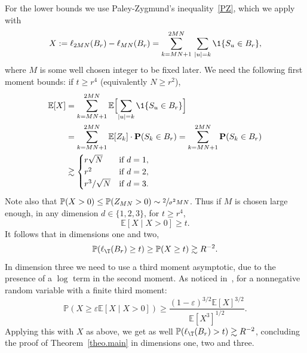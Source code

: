For the lower bounds we use Paley-Zygmund's inequality~\eqref{PZ},
which we apply with
\[
X:= \ell_{2MN}(B_r) - \ell_{MN}(B_r) = \sum_{k=MN+1}^{2MN}\,
\sum_{|u|=k} \1\{S_u\in B_r\},
\]
where $M$ is some well chosen integer to be fixed later.
We need the following first moment bounds: if $t\ge r^4$ (equivalently $N\ge r^2$),
\begin{align*}
\mathbb E[X] & = \sum_{k=MN+1}^{2MN} \mathbb E\Bigl[
\sum_{|u|=k} \1\{S_u \in B_r\}\Bigr]\\
&= \sum_{k=MN+1}^{2MN} \mathbb E[Z_k] \cdot \mathbf P(S_k \in B_r) = \sum_{k=MN+1}^{2MN}\mathbf P(S_k \in B_r) \\
& \gtrsim
\begin{cases}
r\sqrt N & \text{if }d=1, \\
r^2 & \text{if }d=2, \\
r^3/\sqrt{N} & \text{if }d=3.
\end{cases}
\end{align*}
Note also that $\mathbb P(X>0) \le \mathbb P(Z_{MN}>0) \sim \sfrac2 {\sigma^2MN}$. Thus if $M$ is chosen large enough, in any dimension $d\in \{1,2,3\}$, for $t\ge r^4$,
\begin{equation*}
\mathbb E[X\mid X>0] \geq t.
\end{equation*}
It follows that in dimensions one and two,
\[
\mathbb P(\ell_\T(B_r)\ge t ) \ge \mathbb P(X\ge t ) \gtrsim R^{-2}.
\]
In dimension three we need to use a third moment asymptotic, due to the presence of a $\log $ term in the second moment.
As noticed in~\cite[Lem.\,4.4]{AHJ}, for a nonnegative random variable with a finite third moment:
\[
\mathbb P(X\ge \varepsilon \mathbb E[X\mid X>0] )\ge \frac{(1-\varepsilon)^{3/2}\mathbb E[X]^{3/2}}{\mathbb E[X^3]^{1/2}}.
\]
Applying this with $X$ as above,
we get as well $\mathbb P(\ell_\T(B_r)>t ) \gtrsim R^{-2}$, concluding the proof of Theorem~\ref{theo.main} in dimensions one, two and three.

